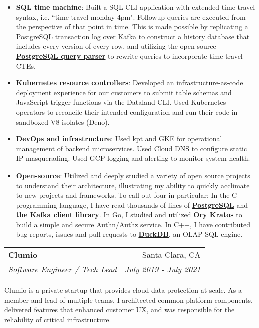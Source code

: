 \documentclass[letterpaper,11pt]{article}
\makeatletter
\newcommand{\resumeItem}[2]{
  \item\small{
    \textbf{#1}{: #2 \vspace{-2pt}}
  }
}
\newcommand{\resumeSubheading}[4]{
  \vspace{-1pt}
    \begin{tabular*}{0.97\textwidth}{l@{\extracolsep{\fill}}r}
      \textbf{#1} & #2 \\
      \textit{\small#3} & \textit{\small #4} \\
    \end{tabular*}\vspace{-5pt}
}
\newcommand{\resumeItemListStart}{\begin{itemize}}
\newcommand{\resumeItemListEnd}{\end{itemize}\vspace{-5pt}}
\makeatother
\begin{document}
      \resumeItemListStart
      \resumeItem{SQL time machine}
          {Built a SQL CLI application with extended time travel syntax, i.e. ``time travel monday 4pm". Followup queries are executed from the perspective of that point in time. This is made possible by replicating a PostgreSQL transaction log over Kafka to construct a history database that includes every version of every row, and utilizing the open-source \href{https://github.com/pganalyze/libpg_query}{\textbf{\underline{PostgreSQL query parser}}} to rewrite queries to incorporate time travel CTEs.}
      \resumeItem{Kubernetes resource controllers}
          {Developed an infrastructure-as-code deployment experience for our customers to submit table schemas and JavaScript trigger functions via the Dataland CLI. Used Kubernetes operators to reconcile their intended configuration and run their code in sandboxed V8 isolates (Deno).}
        \resumeItem{DevOps and infrastructure}
          {Used kpt and GKE for operational management of backend microservices. Used Cloud DNS to configure static IP masquerading. Used GCP logging and alerting to monitor system health.}
      \resumeItem{Open-source}
          {Utilized and deeply studied a variety of open source projects to understand their architecture, illustrating my ability to quickly acclimate to new projects and frameworks. To call out four in particular: In the C programming language, I have read thousands of lines of \href{https://github.com/postgres/postgres}{\textbf{\underline{PostgreSQL}}} and \href{https://github.com/confluentinc/librdkafka}{\textbf{\underline{the Kafka client library}}}. In Go, I studied and utilized \href{https://github.com/ory/kratos}{\textbf{\underline{Ory Kratos}}} to build a simple and secure Authn/Authz service. In C++, I have contributed bug reports, issues and pull requests to \href{https://github.com/duckdb/duckdb/issues?q=author\%3Aaarashy}{\underline{\textbf{DuckDB}}}, an OLAP SQL engine.}
    \resumeItemListEnd
    \vspace{5mm}
    \resumeSubheading
      {Clumio}{Santa Clara, CA}
      {Software Engineer / Tech Lead}{July 2019 - July 2021}
      
      \vspace{4mm}
      Clumio is a private startup that provides cloud data protection at scale. As a member and lead of multiple teams, I architected common platform components, delivered features that enhanced customer UX, and was responsible for the reliability of critical infrastructure.
      
\end{document}
